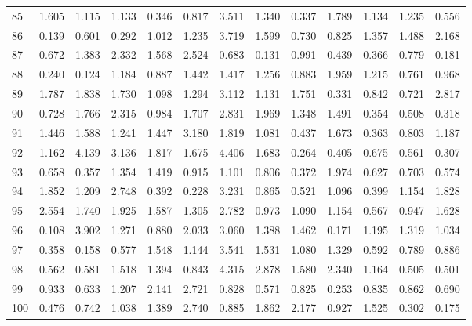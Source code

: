 \begin{tabular}{lrrrrrrrrrrrr}
85  &  1.605 &  1.115 &  1.133 &  0.346 &  0.817 &  3.511 &  1.340 &  0.337 &  1.789 &  1.134 &  1.235 &  0.556 \\
86  &  0.139 &  0.601 &  0.292 &  1.012 &  1.235 &  3.719 &  1.599 &  0.730 &  0.825 &  1.357 &  1.488 &  2.168 \\
87  &  0.672 &  1.383 &  2.332 &  1.568 &  2.524 &  0.683 &  0.131 &  0.991 &  0.439 &  0.366 &  0.779 &  0.181 \\
88  &  0.240 &  0.124 &  1.184 &  0.887 &  1.442 &  1.417 &  1.256 &  0.883 &  1.959 &  1.215 &  0.761 &  0.968 \\
89  &  1.787 &  1.838 &  1.730 &  1.098 &  1.294 &  3.112 &  1.131 &  1.751 &  0.331 &  0.842 &  0.721 &  2.817 \\
90  &  0.728 &  1.766 &  2.315 &  0.984 &  1.707 &  2.831 &  1.969 &  1.348 &  1.491 &  0.354 &  0.508 &  0.318 \\
91  &  1.446 &  1.588 &  1.241 &  1.447 &  3.180 &  1.819 &  1.081 &  0.437 &  1.673 &  0.363 &  0.803 &  1.187 \\
92  &  1.162 &  4.139 &  3.136 &  1.817 &  1.675 &  4.406 &  1.683 &  0.264 &  0.405 &  0.675 &  0.561 &  0.307 \\
93  &  0.658 &  0.357 &  1.354 &  1.419 &  0.915 &  1.101 &  0.806 &  0.372 &  1.974 &  0.627 &  0.703 &  0.574 \\
94  &  1.852 &  1.209 &  2.748 &  0.392 &  0.228 &  3.231 &  0.865 &  0.521 &  1.096 &  0.399 &  1.154 &  1.828 \\
95  &  2.554 &  1.740 &  1.925 &  1.587 &  1.305 &  2.782 &  0.973 &  1.090 &  1.154 &  0.567 &  0.947 &  1.628 \\
96  &  0.108 &  3.902 &  1.271 &  0.880 &  2.033 &  3.060 &  1.388 &  1.462 &  0.171 &  1.195 &  1.319 &  1.034 \\
97  &  0.358 &  0.158 &  0.577 &  1.548 &  1.144 &  3.541 &  1.531 &  1.080 &  1.329 &  0.592 &  0.789 &  0.886 \\
98  &  0.562 &  0.581 &  1.518 &  1.394 &  0.843 &  4.315 &  2.878 &  1.580 &  2.340 &  1.164 &  0.505 &  0.501 \\
99  &  0.933 &  0.633 &  1.207 &  2.141 &  2.721 &  0.828 &  0.571 &  0.825 &  0.253 &  0.835 &  0.862 &  0.690 \\
100 &  0.476 &  0.742 &  1.038 &  1.389 &  2.740 &  0.885 &  1.862 &  2.177 &  0.927 &  1.525 &  0.302 &  0.175 \\
\bottomrule
\end{tabular}

